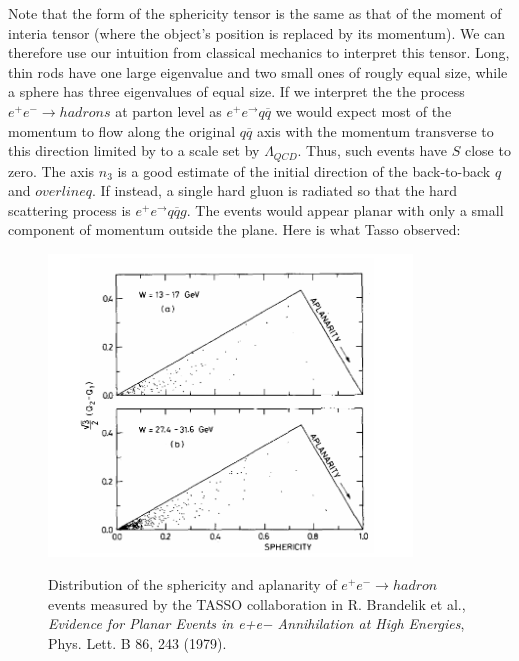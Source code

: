 \documentclass[12pt]{article}
\begin{document}
Note that the form of the sphericity tensor is the same
as that of the moment of interia tensor (where the object's
position is replaced by its momentum).  We can therefore
use our intuition from classical mechanics to interpret this
tensor.  Long, thin rods have one large eigenvalue and two
small ones of rougly equal size, while a sphere has three
eigenvalues of equal size.  If we interpret the the
process $e^+e^-\rightarrow hadrons$ at parton level as
$e^+e^\rightarrow q\overline q$ we would expect most of
the momentum to flow along the original $q\overline q$ axis
with the momentum transverse to this direction limited by to
a scale set by $\Lambda_{QCD}$.  Thus, such events have $S$
close to zero.  The axis $n_3$ is a good estimate of
the initial direction of the back-to-back $q$ and $overline q$.
If instead,  a single hard gluon is radiated so that
the hard scattering process is $e^+e^\rightarrow q\overline qg$.
The events would appear planar with only a small component of 
momentum outside the plane.
Here is what Tasso observed:
\begin{figure}[h]
  \begin{center}
\includegraphics[width=3.8in]{tassoSphericityAplanarity.png}
  \end{center}
  {Distribution of the sphericity and aplanarity
    of $e^+e^-\rightarrow hadron$ events measured by
  the TASSO collaboration in R.
Brandelik et al., {\it Evidence for Planar Events in e+e− Annihilation at High Energies}, Phys. Lett. B 86, 243 (1979).}
\end{figure}
\end{document}
